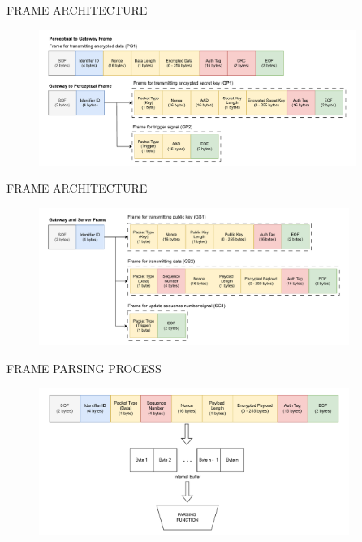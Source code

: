 \begin{frame}{FRAME ARCHITECTURE}
    \vspace{-0.32cm}
    \begin{figure}
    	\centering
    	\includegraphics[width=0.92\textwidth]{pic/frame1.pdf}
    \end{figure}
\end{frame}

\begin{frame}{FRAME ARCHITECTURE}
    \vspace{-0.3cm}
    \begin{figure}
    	\centering
    	\includegraphics[width=0.9\textwidth]{pic/frame2.pdf}
    \end{figure}
\end{frame}

\begin{frame}{FRAME PARSING PROCESS}
\vspace{-0.3cm}
    \begin{figure}
    	\centering
    	\includegraphics[width=0.9\textwidth]{pic/parsing.pdf}
    \end{figure}
\end{frame}

